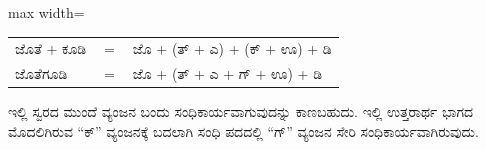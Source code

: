\begin{kbvderiv}
\vspace{4pt plus 3pt minus 1pt}
\begin{center}\begin{adjustbox}{max width=\textwidth}
{\renewcommand{\arraystretch}{1.22}\setlength{\tabcolsep}{4pt}
\begin{tabular}{l c l}
ಜೊತೆ + ಕೂಡಿ & {\color{kbvgrey}$=$} & ಜೊ + (ತ್ + ಎ) + (ಕ್ + ಊ) + ಡಿ \\
ಜೊತೆಗೂಡಿ & {\color{kbvgrey}$=$} & ಜೊ + (ತ್ + ಎ + ಗ್ + ಊ) + ಡಿ \\
\end{tabular}}
\end{adjustbox}\end{center}
\vspace{4pt plus 3pt minus 1pt}
\end{kbvderiv}

\indent ಇಲ್ಲಿ ಸ್ವರದ ಮುಂದೆ ವ್ಯಂಜನ ಬಂದು ಸಂಧಿಕಾರ್ಯವಾಗುವುದನ್ನು ಕಾಣಬಹುದು. ಇಲ್ಲಿ ಉತ್ತರಾರ್ಥ ಭಾಗದ ಮೊದಲಿಗಿರುವ “ಕ್” ವ್ಯಂಜನಕ್ಕೆ ಬದಲಾಗಿ ಸಂಧಿ ಪದದಲ್ಲಿ “ಗ್” ವ್ಯಂಜನ ಸೇರಿ ಸಂಧಿಕಾರ್ಯವಾಗಿರುವುದು.\par
